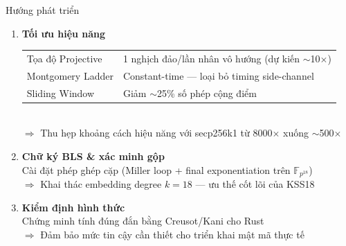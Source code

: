 \begin{frame}{Hướng phát triển}
  \begin{enumerate}
    \item \textbf{Tối ưu hiệu năng}\\[2pt]
      \begin{tabular}{@{}ll@{}}
        Tọa độ Projective & 1 nghịch đảo/lần nhân vô hướng (dự kiến $\sim$10$\times$) \\
        Montgomery Ladder  & Constant-time --- loại bỏ timing side-channel \\
        Sliding Window     & Giảm $\sim$25\% số phép cộng điểm \\
      \end{tabular}\\[2pt]
      {\small\textcolor{clrGreen600}{$\Rightarrow$ Thu hẹp khoảng cách hiệu năng với secp256k1 từ 8000$\times$ xuống $\sim$500$\times$}}

    \vspace{0.5em}
    \item \textbf{Chữ ký BLS \& xác minh gộp}\\[2pt]
      Cài đặt phép ghép cặp (Miller loop + final exponentiation trên $\mathbb{F}_{p^{18}}$)\\
      {\small\textcolor{clrGreen600}{$\Rightarrow$ Khai thác embedding degree $k{=}18$ --- ưu thế cốt lõi của KSS18}}

    \vspace{0.5em}
    \item \textbf{Kiểm định hình thức}\\[2pt]
      Chứng minh tính đúng đắn bằng Creusot/Kani cho Rust\\
      {\small\textcolor{clrGreen600}{$\Rightarrow$ Đảm bảo mức tin cậy cần thiết cho triển khai mật mã thực tế}}
  \end{enumerate}
\end{frame}
